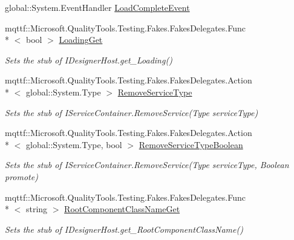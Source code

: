 \begin{DoxyCompactItemize}
global\-::\-System.\-Event\-Handler \hyperlink{class_system_1_1_component_model_1_1_design_1_1_fakes_1_1_stub_i_designer_host_afdaf44ce9d9826783dc7551f743df8cb}{Load\-Complete\-Event}
\item 
mqttf\-::\-Microsoft.\-Quality\-Tools.\-Testing.\-Fakes.\-Fakes\-Delegates.\-Func\\*
$<$ bool $>$ \hyperlink{class_system_1_1_component_model_1_1_design_1_1_fakes_1_1_stub_i_designer_host_adc59a44a5ba41aab76329c928cdad732}{Loading\-Get}
\begin{DoxyCompactList}\small\item\em Sets the stub of I\-Designer\-Host.\-get\-\_\-\-Loading()\end{DoxyCompactList}\item 
mqttf\-::\-Microsoft.\-Quality\-Tools.\-Testing.\-Fakes.\-Fakes\-Delegates.\-Action\\*
$<$ global\-::\-System.\-Type $>$ \hyperlink{class_system_1_1_component_model_1_1_design_1_1_fakes_1_1_stub_i_designer_host_ae43050ce29daaedc9db6104dd15119b8}{Remove\-Service\-Type}
\begin{DoxyCompactList}\small\item\em Sets the stub of I\-Service\-Container.\-Remove\-Service(\-Type service\-Type)\end{DoxyCompactList}\item 
mqttf\-::\-Microsoft.\-Quality\-Tools.\-Testing.\-Fakes.\-Fakes\-Delegates.\-Action\\*
$<$ global\-::\-System.\-Type, bool $>$ \hyperlink{class_system_1_1_component_model_1_1_design_1_1_fakes_1_1_stub_i_designer_host_a0eddb2d74a63510b5e4fefe1d75ccbe1}{Remove\-Service\-Type\-Boolean}
\begin{DoxyCompactList}\small\item\em Sets the stub of I\-Service\-Container.\-Remove\-Service(\-Type service\-Type, Boolean promote)\end{DoxyCompactList}\item 
mqttf\-::\-Microsoft.\-Quality\-Tools.\-Testing.\-Fakes.\-Fakes\-Delegates.\-Func\\*
$<$ string $>$ \hyperlink{class_system_1_1_component_model_1_1_design_1_1_fakes_1_1_stub_i_designer_host_af25380b405a0c5861435ad7c9635c0f0}{Root\-Component\-Class\-Name\-Get}
\begin{DoxyCompactList}\small\item\em Sets the stub of I\-Designer\-Host.\-get\-\_\-\-Root\-Component\-Class\-Name()\end{DoxyCompactList}\item 

\end{DoxyCompactItemize}
